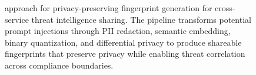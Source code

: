 \begin{figure}[t]
{
}
\caption{\tool approach for privacy-preserving fingerprint generation for cross-service threat intelligence sharing. The pipeline transforms potential prompt injections through PII redaction, semantic embedding, binary quantization, and differential privacy to produce shareable fingerprints that preserve privacy while enabling threat correlation across compliance boundaries.}    
\label{fig:BinaryShield-Privacy-Pipeline}
\vspace{-4mm}      
\end{figure}  